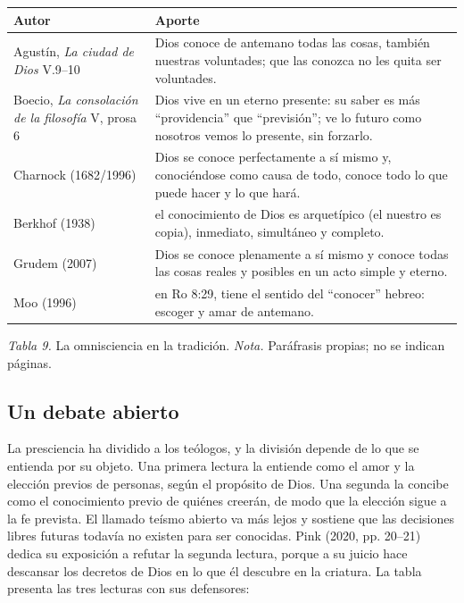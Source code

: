 \begin{center}\small\renewcommand{\arraystretch}{1.25}
\begin{tabular}{@{}L{3.6cm}L{10.8cm}@{}}
\toprule
\textbf{Autor} & \textbf{Aporte} \\ \midrule
Agustín, \emph{La ciudad de Dios} V.9--10 & Dios conoce de antemano todas las cosas, también nuestras voluntades; que las conozca no les quita ser voluntades. \\
Boecio, \emph{La consolación de la filosofía} V, prosa 6 & Dios vive en un eterno presente: su saber es más ``providencia'' que ``previsión''; ve lo futuro como nosotros vemos lo presente, sin forzarlo. \\
Charnock (1682/1996) & Dios se conoce perfectamente a sí mismo y, conociéndose como causa de todo, conoce todo lo que puede hacer y lo que hará. \\
Berkhof (1938) & el conocimiento de Dios es arquetípico (el nuestro es copia), inmediato, simultáneo y completo. \\
Grudem (2007) & Dios se conoce plenamente a sí mismo y conoce todas las cosas reales y posibles en un acto simple y eterno. \\
Moo (1996) & en Ro 8:29,  tiene el sentido del ``conocer'' hebreo: escoger y amar de antemano. \\
\bottomrule
\end{tabular}\par
{\footnotesize\color{gris}\textit{Tabla 9.} La omnisciencia en la tradición. \textit{Nota.} Paráfrasis propias; no se indican páginas.}
\end{center}

\subsection{Un debate abierto}
La presciencia ha dividido a los teólogos, y la división depende de lo que se entienda por su objeto. Una primera lectura la entiende como el amor y la elección previos de personas, según el propósito de Dios. Una segunda la concibe como el conocimiento previo de quiénes creerán, de modo que la elección sigue a la fe prevista. El llamado teísmo abierto va más lejos y sostiene que las decisiones libres futuras todavía no existen para ser conocidas. Pink (2020, pp. 20--21) dedica su exposición a refutar la segunda lectura, porque a su juicio hace descansar los decretos de Dios en lo que él descubre en la criatura. La tabla presenta las tres lecturas con sus defensores:

